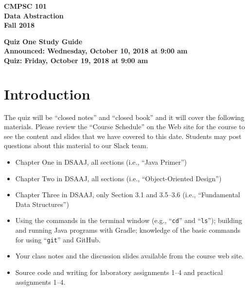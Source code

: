 \documentclass[11pt]{article}
\newcommand{\assignmentduedate}{October 19}
\newcommand{\assignmentassignedate}{October 10}
\newcommand{\assignmentnumber}{One}
\newcommand{\labyear}{2018}
\newcommand{\assignedday}{Wednesday}
\newcommand{\dueday}{Friday}
\newcommand{\labtime}{9:00 am}
\newcommand{\assigneddate}{Announced: \assignedday, \assignmentassignedate, \labyear{} at \labtime{}}
\newcommand{\duedate}{Quiz: \dueday, \assignmentduedate, \labyear{} at \labtime{}}
\newcommand{\command}[1]{``\lstinline{#1}''}
\newcommand{\guidetitle}[1]
{
  \begin{center}
    \begin{center}
      \bf
      CMPSC 101\\Data Abstraction\\
      Fall 2018\\
      \medskip
    \end{center}
    \bf
    #1
  \end{center}
}
\begin{document}
\thispagestyle{empty}

\guidetitle{Quiz \assignmentnumber{} Study Guide \\ \assigneddate{} \\ \duedate{}}

\section*{Introduction}

\noindent The quiz will be ``closed notes'' and ``closed book'' and it will
cover the following materials. Please review the ``Course Schedule'' on the Web
site for the course to see the content and slides that we have covered to this
date. Students may post questions about this material to our Slack team.

\begin{itemize}

  \itemsep 0in

  \item Chapter One in DSAAJ, all sections (i.e., ``Java Primer'')

  \item Chapter Two in DSAAJ, all sections (i.e., ``Object-Oriented Design'')

  \item Chapter Three in DSAAJ, only Section 3.1 and 3.5--3.6 (i.e.,
    ``Fundamental Data Structures'')



  \item Using the commands in the terminal window (e.g., \command{cd} and
    \command{ls}); building and running Java programs with Gradle; knowledge of
    the basic commands for using \command{git} and GitHub.

  \item Your class notes and the discussion slides available from the course web
    site.

  \item Source code and writing for laboratory assignments 1--4 and practical
    assignments 1--4.

\end{itemize}
\end{document}
